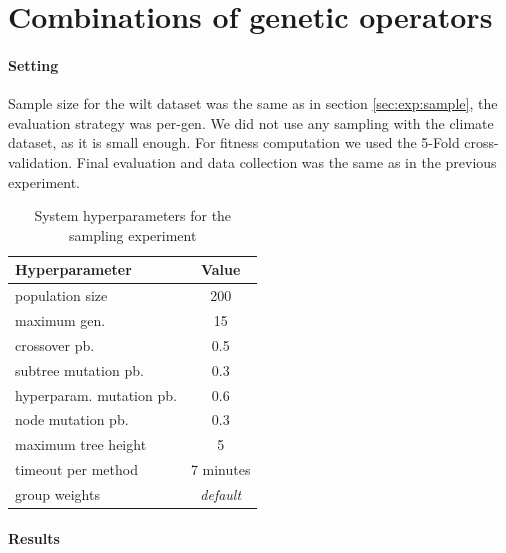 





\section{Combinations of genetic operators} \label{sec:exp:genop}


\paragraph{Setting}
Sample size for the wilt dataset was the same as in section
\ref{sec:exp:sample}, the evaluation strategy was per-gen. We did not use any
sampling with the climate dataset, as it is small enough. For fitness
computation we used the 5-Fold cross-validation. Final evaluation and data
collection was the same as in the previous experiment.

\begin{table}[ht]

\centering
\caption{System hyperparameters for the sampling experiment}\label{tab04:exp2:setting}
\begin{tabular}{l c}
\toprule
\textbf{\upshape Hyperparameter} & \textbf{Value} \\
\midrule
population size & 200 \\
maximum gen. & 15 \\
crossover pb. & 0.5 \\
subtree mutation pb. & 0.3 \\
hyperparam. mutation pb. & 0.6 \\
node mutation pb. & 0.3 \\
maximum tree height & 5 \\
timeout per method  & 7 minutes \\
group weights & \textit{default} \\
\bottomrule

\end{tabular}

\end{table}


\paragraph{Results}


